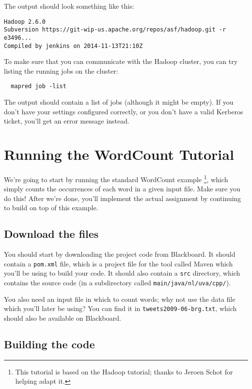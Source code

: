\documentclass[a4paper,11pt]{article}
\begin{document}
  The output should look something like this: 
  \begin{lstlisting}
Hadoop 2.6.0
Subversion https://git-wip-us.apache.org/repos/asf/hadoop.git -r e3496...
Compiled by jenkins on 2014-11-13T21:10Z
  \end{lstlisting}

  To make sure that you can communicate with the Hadoop cluster, you can try listing the running jobs on the cluster:

  \begin{lstlisting}
  mapred job -list
  \end{lstlisting}

  The output should contain a list of jobs (although it might be empty). If you don't have your settings configured
  correctly, or you don't have a valid Kerberos ticket, you'll get an error message instead.

  \pagebreak
  \section{Running the WordCount Tutorial}


  We're going to start by running the standard WordCount example \footnote{This tutorial is based on the Hadoop tutorial; thanks to Jeroen Schot for helping adapt it.},
  which simply counts the occurrences of each word in a given input file.
  Make sure you do this! After we're done, you'll implement the actual assignment by continuing to build on top of this example.

  \subsection{Download the files}

  You should start by downloading the project code from Blackboard. It should contain a \texttt{pom.xml} file, which is a project file for the tool
  called Maven which you'll be using to build your code. It should also contain a \texttt{src} directory, which contains the source code (in a
  subdirectory called \texttt{main/java/nl/uva/cpp/}).

  You also need an input file in which to count words; why not use the data file which you'll later be using?
  You can find it in \texttt{tweets2009-06-brg.txt}, which should also be available on Blackboard. 

  \subsection{Building the code}
\end{document}

